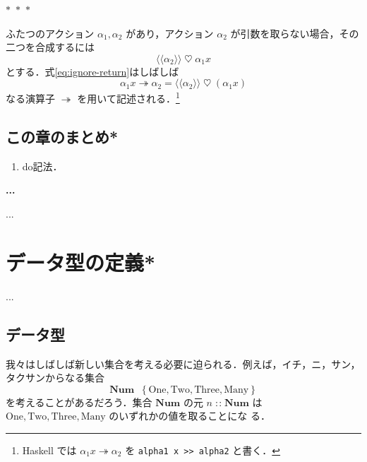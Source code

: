\documentclass[a5paper,twoside,fleqn]{jsbook}
\newcommand{\Langle}{\langle\!\langle}
\newcommand{\Rangle}{\rangle\!\rangle}
\newcommand{\separator}{\begin{center}$*$~$*$~$*$\end{center}}
\newcommand{\programminglanguage}[1]{\textsf{#1}}
\newcommand{\haskell}{\programminglanguage{Haskell}}
\newenvironment{note}[1]{\begin{boxnote}\begin{center}\textbf{#1}\end{center}}{\end{boxnote}}
\newcommand{\code}[1]{\texttt{#1}}
\newcommand{\mSpecialConstant}[1]{\textrm{#1}} %
\newcommand{\mNumOne}{\mSpecialConstant{One}}
\newcommand{\mNumTwo}{\mSpecialConstant{Two}}
\newcommand{\mNumThree}{\mSpecialConstant{Three}}
\newcommand{\mNumMany}{\mSpecialConstant{Many}}
\DeclareMathOperator{\mBind}{\heartsuit}
\DeclareMathOperator{\mBindRightIgnore}{\twoheadrightarrow}
\DeclareMathOperator{\mDefEq}{\stackrel{\mathrm{def}}{=}}
\DeclareMathOperator{\mIn}{{:\!:}}
\newcommand{\mSet}[1]{\mathbf{#1}}
\newcommand{\mFuncWith}[1]{\Langle#1\Rangle}
\newcommand{\mSetWith}[1]{\left\{#1\right\}}
\begin{document}
\separator

ふたつのアクション $\alpha_1,\alpha_2$ があり，アクション $\alpha_2$
が引数を取らない場合，その二つを合成するには
\begin{equation}
\label{eq:ignore-return}
\mFuncWith{\alpha_2}\mBind\alpha_1 x
\end{equation}
とする．式\eqref{eq:ignore-return}はしばしば
\begin{equation}
\alpha_1 x\mBindRightIgnore\alpha_2=\mFuncWith{\alpha_2}\mBind(\alpha_1x)
\end{equation}
なる演算子 $\mBindRightIgnore$ を用いて記述される．\footnote{\haskell
では $\alpha_1x\mBindRightIgnore\alpha_2$ を \code{alpha1 x >>
alpha2} と書く．}

\section{この章のまとめ*}

\begin{enumerate}
\item do記法．
\end{enumerate}

\begin{note}{...}
...
\end{note}


\chapter{データ型の定義*}

...

\section{データ型}

我々はしばしば新しい集合を考える必要に迫られる．例えば，イチ，ニ，サン，
タクサンからなる集合
\begin{equation}
\mSet{Num}\mDefEq\mSetWith{\mNumOne,\mNumTwo,\mNumThree,\mNumMany}
\end{equation}
を考えることがあるだろう．集合 $\mSet{Num}$ の元 $n\mIn\mSet{Num}$ は
$\mNumOne,\mNumTwo,\mNumThree,\mNumMany$ のいずれかの値を取ることにな
る．
\end{document}
